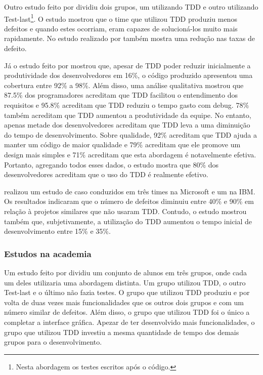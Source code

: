 Outro estudo feito por  dividiu dois grupos, um utilizando TDD e outro utilizando Test-last\footnote{Nesta abordagem os testes escritos após o código.}. O estudo mostrou que o time que utilizou TDD produziu menos defeitos e quando estes ocorriam, eram capazes de solucioná-los muito mais rapidamente. No estudo realizado por \cite{DammTDD} também mostra uma redução nas taxas de defeito.

Já o estudo feito por \cite{GeorgeTDD} mostrou que, apesar de TDD poder reduzir inicialmente a produtividade dos desenvolvedores em 16\%, o código produzido apresentou uma cobertura entre 92\% a 98\%. Além disso, uma análise qualitativa mostrou que 87.5\% dos programadores acreditam que TDD facilitou o entendimento dos requisitos e 95.8\% acreditam que TDD reduziu o tempo gasto com debug. 78\% também acreditam que TDD aumentou a produtividade da equipe. No entanto, apenas metade dos desenvolvedores acreditam que TDD leva a uma diminuição do tempo de desenvolvimento. Sobre qualidade, 92\% acreditam que TDD ajuda a manter um código de maior qualidade e 79\% acreditam que ele promove um design mais simples e 71\% acreditam que esta abordagem é notavelmente efetiva. Portanto, agregando todos esses dados, o estudo mostra que 80\% dos desenvolvedores acreditam que o uso do TDD é realmente efetivo.

 realizou um estudo de caso conduzidos em três times na Microsoft e um na IBM. Os resultados indicaram que o número de defeitos diminuiu entre 40\% e 90\% em relação à projetos similares que não usaram TDD. Contudo, o estudo mostrou também que, subjetivamente, a utilização do TDD aumentou o tempo inicial de desenvolvimento entre 15\% e 35\%.


\subsubsection{Estudos na academia} %
\label{sub:estudos_na_academia}

Um estudo feito por  dividiu um conjunto de alunos em três grupos, onde cada um deles utilizaria uma abordagem distinta. Um grupo utilizou TDD, o outro Test-last e o último não fazia testes. O grupo que utilizou TDD produziu e por volta de duas vezes  mais funcionalidades que os outros dois grupos e com um número similar de defeitos. Além disso, o grupo que utilizou TDD foi o único a completar a interface gráfica. Apezar de ter desenvolvido mais funcionalidades, o grupo que utilizou TDD investiu a mesma quantidade de tempo dos demais grupos para o desenvolvimento.

